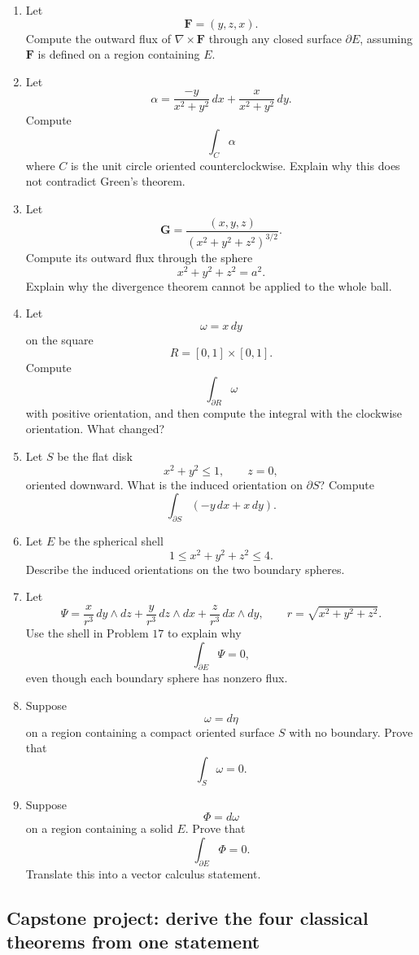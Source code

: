 \begin{enumerate}
\item Let
\[
    \mathbf F=(y,z,x).
\]
Compute the outward flux of \(\nabla\times\mathbf F\) through any closed surface
\(\partial E\), assuming \(\mathbf F\) is defined on a region containing \(E\).

\item Let
\[
    \alpha=
    \frac{-y}{x^2+y^2}\,dx+
    \frac{x}{x^2+y^2}\,dy.
\]
Compute
\[
    \int_C\alpha
\]
where \(C\) is the unit circle oriented counterclockwise.  Explain why this does not
contradict Green's theorem.

\item Let
\[
    \mathbf G=\frac{(x,y,z)}{(x^2+y^2+z^2)^{3/2}}.
\]
Compute its outward flux through the sphere
\[
    x^2+y^2+z^2=a^2.
\]
Explain why the divergence theorem cannot be applied to the whole ball.

\item Let
\[
    \omega=x\,dy
\]
on the square
\[
    R=[0,1]\times[0,1].
\]
Compute
\[
    \int_{\partial R}\omega
\]
with positive orientation, and then compute the integral with the clockwise orientation.
What changed?

\item Let \(S\) be the flat disk
\[
    x^2+y^2\le1,\qquad z=0,
\]
oriented downward.  What is the induced orientation on \(\partial S\)?  Compute
\[
    \int_{\partial S}(-y\,dx+x\,dy).
\]

\item Let \(E\) be the spherical shell
\[
    1\le x^2+y^2+z^2\le4.
\]
Describe the induced orientations on the two boundary spheres.

\item Let
\[
    \Psi=
    \frac{x}{r^3}\,dy\wedge dz+
    \frac{y}{r^3}\,dz\wedge dx+
    \frac{z}{r^3}\,dx\wedge dy,
    \qquad
    r=\sqrt{x^2+y^2+z^2}.
\]
Use the shell in Problem \(17\) to explain why
\[
    \int_{\partial E}\Psi=0,
\]
even though each boundary sphere has nonzero flux.

\item Suppose
\[
    \omega=d\eta
\]
on a region containing a compact oriented surface \(S\) with no boundary.  Prove that
\[
    \int_S\omega=0.
\]

\item Suppose
\[
    \Phi=d\omega
\]
on a region containing a solid \(E\).  Prove that
\[
    \int_{\partial E}\Phi=0.
\]
Translate this into a vector calculus statement.
\end{enumerate}

\subsection{Capstone project: derive the four classical theorems from one statement}

